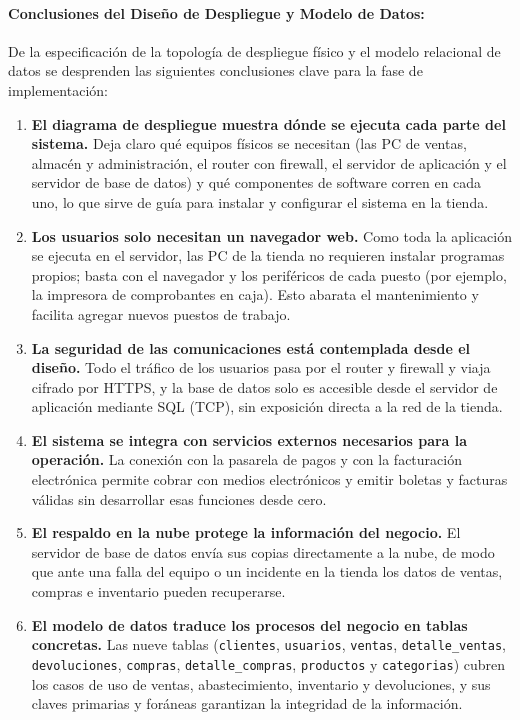 \documentclass[12pt,a4paper]{article}
\begin{document}
\paragraph{Conclusiones del Diseño de Despliegue y Modelo de Datos:}
De la especificación de la topología de despliegue físico y el modelo relacional de datos se desprenden las siguientes conclusiones clave para la fase de implementación:
\begin{enumerate}
  \item \textbf{El diagrama de despliegue muestra dónde se ejecuta cada parte del sistema.} Deja claro qué equipos físicos se necesitan (las PC de ventas, almacén y administración, el router con firewall, el servidor de aplicación y el servidor de base de datos) y qué componentes de software corren en cada uno, lo que sirve de guía para instalar y configurar el sistema en la tienda.
  \item \textbf{Los usuarios solo necesitan un navegador web.} Como toda la aplicación se ejecuta en el servidor, las PC de la tienda no requieren instalar programas propios; basta con el navegador y los periféricos de cada puesto (por ejemplo, la impresora de comprobantes en caja). Esto abarata el mantenimiento y facilita agregar nuevos puestos de trabajo.
  \item \textbf{La seguridad de las comunicaciones está contemplada desde el diseño.} Todo el tráfico de los usuarios pasa por el router y firewall y viaja cifrado por HTTPS, y la base de datos solo es accesible desde el servidor de aplicación mediante SQL (TCP), sin exposición directa a la red de la tienda.
  \item \textbf{El sistema se integra con servicios externos necesarios para la operación.} La conexión con la pasarela de pagos y con la facturación electrónica permite cobrar con medios electrónicos y emitir boletas y facturas válidas sin desarrollar esas funciones desde cero.
  \item \textbf{El respaldo en la nube protege la información del negocio.} El servidor de base de datos envía sus copias directamente a la nube, de modo que ante una falla del equipo o un incidente en la tienda los datos de ventas, compras e inventario pueden recuperarse.
  \item \textbf{El modelo de datos traduce los procesos del negocio en tablas concretas.} Las nueve tablas (\texttt{clientes}, \texttt{usuarios}, \texttt{ventas}, \texttt{detalle\_ventas}, \texttt{devoluciones}, \texttt{compras}, \texttt{detalle\_compras}, \texttt{productos} y \texttt{categorias}) cubren los casos de uso de ventas, abastecimiento, inventario y devoluciones, y sus claves primarias y foráneas garantizan la integridad de la información.

\end{enumerate}
\end{document}
